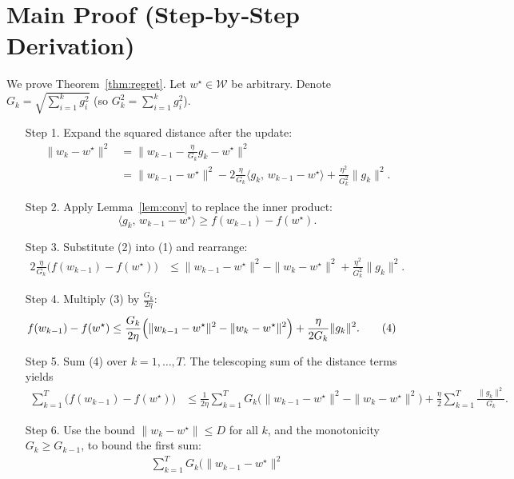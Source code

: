\documentclass{article}
\begin{document}
\section*{Main Proof (Step‑by‑Step Derivation)}
We prove Theorem~\ref{thm:regret}. Let $w^{\star}\in\mathcal{W}$ be arbitrary.
Denote $G_{k}=\sqrt{\sum_{i=1}^{k}g_{i}^{2}}$ (so $G_{k}^{2}= \sum_{i=1}^{k}g_{i}^{2}$).

\begin{enumerate}
\item[Step 1.] Expand the squared distance after the update:
\begin{align}
\|w_{k}-w^{\star}\|^{2}
&= \bigl\|w_{k-1}-\frac{\eta}{G_{k}}g_{k}-w^{\star}\bigr\|^{2}\nonumber\\
&= \|w_{k-1}-w^{\star}\|^{2}
   -2\frac{\eta}{G_{k}}\langle g_{k},\,w_{k-1}-w^{\star}\rangle
   +\frac{\eta^{2}}{G_{k}^{2}}\|g_{k}\|^{2}. \tag{1}
\end{align}
\item[Step 2.] Apply Lemma~\ref{lem:conv} to replace the inner product:
\[
\langle g_{k},\,w_{k-1}-w^{\star}\rangle
\ge f(w_{k-1})-f(w^{\star}). \tag{2}
\]
\item[Step 3.] Substitute (2) into (1) and rearrange:
\begin{align}
2\frac{\eta}{G_{k}}\bigl(f(w_{k-1})-f(w^{\star})\bigr)
&\le \|w_{k-1}-w^{\star}\|^{2}-\|w_{k}-w^{\star}\|^{2}
   +\frac{\eta^{2}}{G_{k}^{2}}\|g_{k}\|^{2}. \tag{3}
\end{align}
\item[Step 4.] Multiply (3) by $\frac{G_{k}}{2\eta}$:
\begin{align}
f(w_{k-1})-f(w^{\star})
&\le \frac{G_{k}}{2\eta}\Bigl(\|w_{k-1}-w^{\star}\|^{2}
    -\|w_{k}-w^{\star}\|^{2}\Bigr)
   +\frac{\eta}{2G_{k}}\|g_{k}\|^{2}. \tag{4}
\end{align}
\item[Step 5.] Sum (4) over $k=1,\dots,T$.
The telescoping sum of the distance terms yields
\begin{align}
\sum_{k=1}^{T}\bigl(f(w_{k-1})-f(w^{\star})\bigr)
&\le \frac{1}{2\eta}\sum_{k=1}^{T}G_{k}
   \bigl(\|w_{k-1}-w^{\star}\|^{2}
        -\|w_{k}-w^{\star}\|^{2}\bigr)
   +\frac{\eta}{2}\sum_{k=1}^{T}\frac{\|g_{k}\|^{2}}{G_{k}}. \tag{5}
\end{align}
\item[Step 6.] Use the bound $\|w_{k}-w^{\star}\|\le D$ for all $k$,
and the monotonicity $G_{k}\ge G_{k-1}$, to bound the first sum:
\begin{align}
\sum_{k=1}^{T}G_{k}\bigl(\|w_{k-1}-w^{\star}\|^{2}

\end{align}
\end{enumerate}
\end{document}

